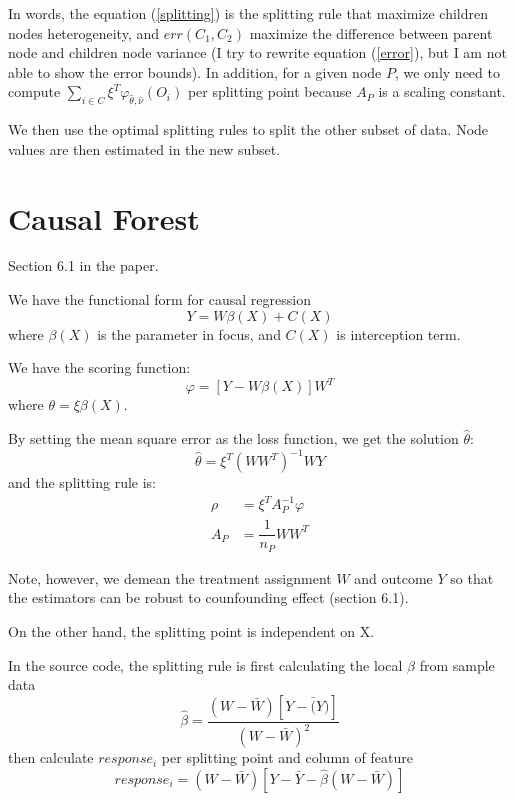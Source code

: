\documentclass[12pt,letterpaper]{article}
\begin{document}
In words, the equation (\ref{splitting}) is the splitting rule that maximize children nodes heterogeneity, and $ err(C_1, C_2) $ maximize the difference between parent node and children node variance (I try to rewrite equation (\ref{error}), but I am not able to show the error bounds). In addition, for a given node $ P $, we only need to compute $ \sum\limits_{i \in C} \xi^T \varphi_{\hat{\theta}, \hat{\nu}}(O_{i}) $ per splitting point because $ A_P $ is a scaling constant. 

We then use the optimal splitting rules to split the other subset of data. Node values are then estimated in the new subset. 

\section{Causal Forest }
Section 6.1 in the paper.

We have the functional form for causal regression
\begin{equation}\label{key}
	Y = W\beta(X) + C(X)
\end{equation}
where $ \beta(X) $ is the parameter in focus, and $ C(X) $ is interception term. 

We have the scoring function:
\begin{equation}\label{key}
	\varphi = [Y-W\beta(X)]W^T
\end{equation}
where $ \theta = \xi \beta(X) $.
 
By setting the  mean square error as the loss function, we get the solution $\hat{\theta} $:
\begin{equation}\label{key}
	\hat{\theta} = \xi^T(WW^{T})^{-1}WY
\end{equation}
and the splitting rule is:
\begin{align}\label{key}
	\rho & = \xi^T A_{P}^{-1}\varphi \\ 
	A_{P} & = \dfrac{1}{n_P} WW^T 
\end{align}

Note, however, we demean the treatment assignment $ W $ and outcome $ Y $ so that the estimators can be robust to counfounding effect (section 6.1).

On the other hand, the splitting point is independent on X.


In the source code, the splitting rule is first calculating the local $ \beta $ from sample data
\begin{equation}\label{key}
	\hat{\beta} = \dfrac{(W-\bar{W})[Y-\bar(Y)]}{(W-\bar{W})^2}
\end{equation}
then calculate $ response_{i} $ per splitting point and column of feature
\begin{equation}\label{key}
		response_{i} = (W-\bar{W})[Y-\bar{Y} - \hat{\beta}(W-\bar{W})] 
\end{equation}
\end{document}
